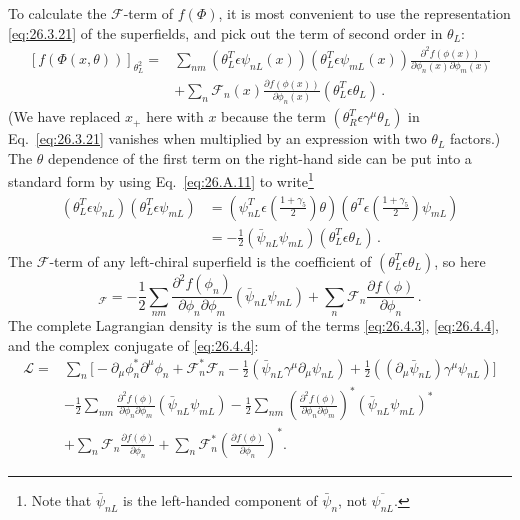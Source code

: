 To calculate the \(\mathcal{F}\)-term of \(f(\Phi)\), it is most convenient to
use the representation \eqref{eq:26.3.21} of the superfields, and pick out the
term of second order in \(\theta_L\):
\[
  \begin{aligned}
  [f(\Phi(x,\theta))]_{\theta_L^2}
  ={}&\sum_{nm}
    (\theta_L^T\epsilon\psi_{nL}(x))
    (\theta_L^T\epsilon\psi_{mL}(x))
    \frac{\partial^2f(\phi(x))}
      {\partial\phi_n(x)\partial\phi_m(x)}
  \\
  &+\sum_n\mathcal{F}_n(x)
    \frac{\partial f(\phi(x))}{\partial\phi_n(x)}
    (\theta_L^T\epsilon\theta_L)\,.
  \end{aligned}
\]
(We have replaced \(x_+\) here with \(x\) because the term
\((\theta_R^T\epsilon\gamma^\mu\theta_L)\) in Eq.~\eqref{eq:26.3.21}
vanishes when multiplied by an expression with two \(\theta_L\) factors.)
The \(\theta\) dependence of the first term on the right-hand side can be put
into a standard form by using Eq.~\eqref{eq:26.A.11} to write\footnote{Note
that \(\bar\psi_{nL}\) is the left-handed component of \(\bar\psi_n\), not
\(\overline{\psi_{nL}}\).}
\[
  \begin{aligned}
  (\theta_L^T\epsilon\psi_{nL})(\theta_L^T\epsilon\psi_{mL})
  &=
  \left(\psi_{nL}^T\epsilon
    \left(\frac{1+\gamma_5}{2}\right)\theta\right)
  \left(\theta^T\epsilon
    \left(\frac{1+\gamma_5}{2}\right)\psi_{mL}\right)
  \\
  &=-\frac12(\bar\psi_{nL}\psi_{mL})
    (\theta_L^T\epsilon\theta_L)\,.
  \end{aligned}
\]
The \(\mathcal{F}\)-term of any left-chiral superfield is the coefficient of
\((\theta_L^T\epsilon\theta_L)\), so here
\begin{equation}
  [f(\Phi)]_{\mathcal{F}}
  =-\frac12\sum_{nm}
    \frac{\partial^2f(\phi_n)}{\partial\phi_n\partial\phi_m}
    (\bar\psi_{nL}\psi_{mL})
  +\sum_n\mathcal{F}_n\frac{\partial f(\phi)}{\partial\phi_n}\,.
  \tag{26.4.4}\label{eq:26.4.4}
\end{equation}
The complete Lagrangian density is the sum of the terms
\eqref{eq:26.4.3}, \eqref{eq:26.4.4}, and the complex conjugate of
\eqref{eq:26.4.4}:
\begin{equation}
  \begin{aligned}
  \mathcal{L}={}&
  \sum_n\biggl[
    -\partial_\mu\phi_n^*\partial^\mu\phi_n
    +\mathcal{F}_n^*\mathcal{F}_n
    -\frac12(\bar\psi_{nL}\gamma^\mu\partial_\mu\psi_{nL})
    +\frac12((\partial_\mu\bar\psi_{nL})\gamma^\mu\psi_{nL})
  \biggr]
  \\
  &-\frac12\sum_{nm}
    \frac{\partial^2f(\phi)}{\partial\phi_n\partial\phi_m}
    (\bar\psi_{nL}\psi_{mL})
  -\frac12\sum_{nm}
    \left(\frac{\partial^2f(\phi)}
      {\partial\phi_n\partial\phi_m}\right)^*
    (\bar\psi_{nL}\psi_{mL})^*
  \\
  &+\sum_n\mathcal{F}_n\frac{\partial f(\phi)}{\partial\phi_n}
  +\sum_n\mathcal{F}_n^*
    \left(\frac{\partial f(\phi)}{\partial\phi_n}\right)^* .
  \end{aligned}
  \tag{26.4.5}\label{eq:26.4.5}
\end{equation}
